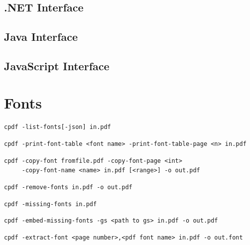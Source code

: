 \documentclass{book}
\begin{document}
\begin{dotnetcpdflib}
\clearpage
\section*{.NET Interface}
\begin{small}\tt

\end{small}
\end{dotnetcpdflib}

\begin{jcpdflib}
\clearpage
\section*{Java Interface}
\begin{small}\tt

\end{small}
\end{jcpdflib}

\begin{jscpdflib}
\clearpage
\section*{JavaScript Interface}
\begin{small}\tt

\end{small}
\end{jscpdflib}

\chapter{Fonts}\pagestyle{fancy}\label{chap:14}
 {\small \begin{framed}

  \small\noindent\verb!cpdf -list-fonts[-json] in.pdf!

  \vspace{1.5mm}
  \noindent\verb!cpdf -print-font-table <font name> -print-font-table-page <n> in.pdf!
  
  \vspace{1.5mm}
  \noindent\verb!cpdf -copy-font fromfile.pdf -copy-font-page <int>!\\
  \noindent\verb!     -copy-font-name <name> in.pdf [<range>] -o out.pdf!

  \vspace{1.5mm}
  \noindent\verb!cpdf -remove-fonts in.pdf -o out.pdf!

  \vspace{1.5mm}
  \noindent\verb!cpdf -missing-fonts in.pdf!

  \vspace{1.5mm}
  \noindent\verb!cpdf -embed-missing-fonts -gs <path to gs> in.pdf -o out.pdf!

  \vspace{1.5mm}
  \noindent\verb!cpdf -extract-font <page number>,<pdf font name> in.pdf -o out.font!

  \end{framed}}
 
\end{document}
